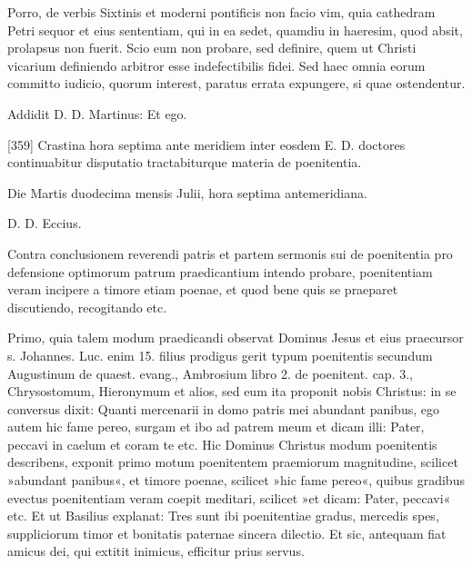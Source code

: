 Porro, de verbis Sixtinis et moderni pontificis non facio vim, quia cathedram Petri sequor et eius sententiam, qui in ea sedet, quamdiu in haeresim, quod absit, prolapsus non fuerit. Scio eum non probare, sed definire, quem ut Christi vicarium definiendo arbitror esse indefectibilis fidei. Sed haec omnia eorum committo iudicio, quorum interest, paratus errata expungere, si quae ostendentur.

Addidit D. D. Martinus: Et ego.

[359] Crastina hora septima ante meridiem inter eosdem E. D. doctores continuabitur disputatio tractabiturque materia de poenitentia.

Die Martis duodecima mensis Julii, hora septima antemeridiana.

D. D. Eccius.

Contra conclusionem reverendi patris et partem sermonis sui de poenitentia pro defensione optimorum patrum praedicantium intendo probare, poenitentiam veram incipere a timore etiam poenae, et quod bene quis se praeparet discutiendo, recogitando etc.

Primo, quia talem modum praedicandi observat Dominus Jesus et eius praecursor s. Johannes. Luc. enim 15. filius prodigus gerit typum poenitentis secundum Augustinum de quaest. evang., Ambrosium libro 2. de poenitent. cap. 3., Chrysostomum, Hieronymum et alios, sed eum ita proponit nobis Christus: in se conversus dixit: Quanti mercenarii in domo patris mei abundant panibus, ego autem hic fame pereo, surgam et ibo ad patrem meum et dicam illi: Pater, peccavi in caelum et coram te etc. Hic Dominus Christus modum poenitentis describens, exponit primo motum poenitentem praemiorum magnitudine, scilicet »abundant panibus«, et timore poenae, scilicet »hic fame pereo«, quibus gradibus evectus poenitentiam veram coepit meditari, scilicet »et dicam: Pater, peccavi« etc. Et ut Basilius explanat: Tres sunt ibi poenitentiae gradus, mercedis spes, suppliciorum timor et bonitatis paternae sincera dilectio. Et sic, antequam fiat amicus dei, qui extitit inimicus, efficitur prius servus.

